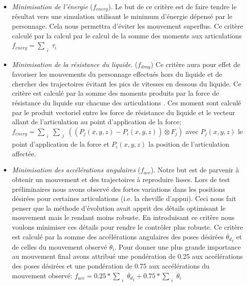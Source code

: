 \documentclass[runningheads,a4paper]{llncs}
\begin{document}
\begin{itemize}
\item{\textit{Minimisation de l'énergie} ($f_{energ}$). Le but de ce critère est de faire tendre le résultat vers une simulation utilisant le minimum d'énergie dépensé par le personnage. Cela nous permettra d'éviter les mouvement superflus. Ce critère calculé par la calcul par le calcul de la somme des moments aux articulations $f_{energ}=\sum_{\substack{i}}{\tau_i}$} 
\item{\textit{Minimisation de la résistance du liquide}. ($f_{drag}$) Ce critère aura pour effet de favoriser les mouvements du personnage effectués hors du liquide et de chercher des trajectoires évitant les pics de vitesses en dessous du liquide. Ce critère est calculé par la somme des moments produits par la force de résistance du liquide sur chacune des articulations . Ces moment sont calculé par le produit vectoriel entre les force de résistance du liquide et le vecteur allant de l'articulation au point d'application de la force; $f_{energ}=\sum_{\substack{i}}\sum_{\substack{j}}((P_j(x,y,z)-P_i(x,y,z)) \otimes  F_j)$ avec $P_j(x,y,z)$ le point d'application de la force et $P_i(x,y,z)$ la position de l'articulation affectée.}
\item{\textit{Minimisation des accélérations angulaires} ($f_{acc}$). Notre but est de parvenir à obtenir un mouvement et des trajectoires à reproduire lisses. Lors de test préliminaires nous avons observé des fortes variations dans les positions désirées pour certaines articulations (i.e. la cheville d'appui). Ceci nous fait penser que la méthode d'évolution avait apprit des détails optimisant le mouvement mais le rendant moins robuste. En introduisant ce critère nous voulons minimiser ces détails pour rendre le contrôler plus robuste. Ce critère est calculé par la somme des accélérations angulaires des poses désirées $\ddot{\theta_d}_i$ et de celles du mouvement observé $\ddot{\theta}_i$.  Pour donner une plus grande importance au mouvement final avons attribué une pondération de 0.25 aux accélérations des poses désirées et une pondération de 0.75 aux accélérations du mouvement observé: $f_{acc}=0.25*\sum_{\substack{i}}\ddot{\theta_d}_i+0.75*\sum_{\substack{i}}\ddot{\theta}_i$ }
\end{itemize}
\end{document}
